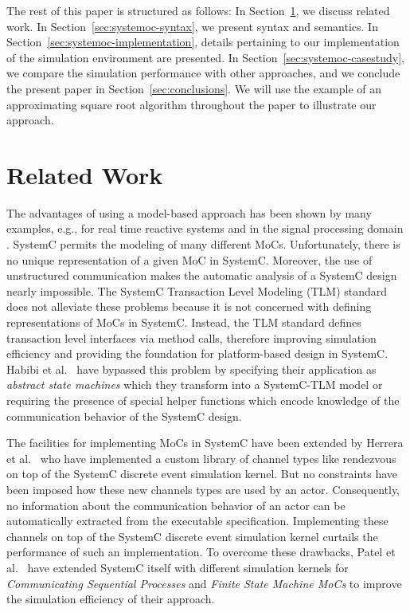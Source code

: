 The rest of this paper is structured as follows:
In Section~\ref{sec:related-work}, we discuss related work.
In Section~\ref{sec:systemoc-syntax}, we present \SysteMoC{} syntax and semantics.
In Section~\ref{sec:systemoc-implementation}, details pertaining to our implementation of the \SysteMoC{} simulation environment are presented.
In Section~\ref{sec:systemoc-casestudy}, we compare the \SysteMoC{} simulation performance with other approaches,
and we conclude the present paper in Section~\ref{sec:conclusions}.
We will use the example of an approximating square root algorithm throughout the paper to illustrate our approach.

\section{Related Work}\label{sec:related-work}

The advantages of using a model-based approach has been shown by many examples, e.g., for real time reactive systems \cite{BFMV05} and in the signal processing domain \cite{bhattacharyya,bb:2000a}.
SystemC \cite{glms:2002,systemc-lrm:2003} permits the modeling of many different MoCs.
Unfortunately, there is no unique representation of a given MoC in SystemC.
Moreover, the use of unstructured communication makes the automatic analysis of a SystemC design nearly impossible.
The SystemC Transaction Level Modeling (TLM) standard \cite{SystemC-TLM05} does not alleviate these problems because it is not concerned with defining representations of MoCs in SystemC.
Instead, the TLM standard defines transaction level interfaces via method calls, therefore improving simulation efficiency and providing the foundation for platform-based design in SystemC.
Habibi et al.~\cite{HTSLM06, HMT06} have bypassed this problem by specifying their application as \emph{abstract state machines} which they transform into a SystemC-TLM model or requiring the presence of special helper functions which encode knowledge of the communication behavior of the SystemC design.

The facilities for implementing MoCs in SystemC have been extended by Herrera et al.~\cite{herrerasystemc:2004} who have implemented a custom library of channel types like rendezvous on top of the SystemC discrete event simulation kernel.
But no constraints have been imposed how these new channels types are used by an actor.
Consequently, no information about the communication behavior of an actor can be automatically extracted from the executable specification.
Implementing these channels on top of the SystemC discrete event simulation kernel curtails the performance of such an implementation.
To overcome these drawbacks, Patel et al.~\cite{PS:2005, PS:2004} have extended SystemC itself with different simulation kernels for \emph{Communicating Sequential Processes} and \emph{Finite State Machine MoCs} to improve the simulation efficiency of their approach.

